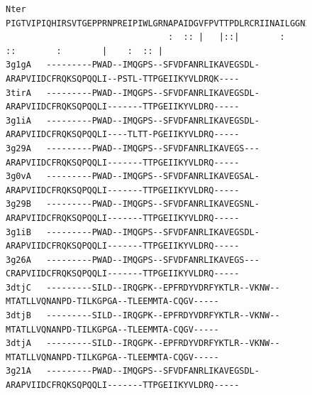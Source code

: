 \documentclass[12pt]{article}
\newcommand{\3}{$3_{10}$}
\begin{document}
\begin{figure}
\centering
\begin{singlespace}
\begin{tiny}
\begin{Verbatim}[frame=single]
Nter    PIGTVIPIQHIRSVTGEPPRNPREIPIWLGRNAPAIDGVFPVTTPDLRCRIINAILGGNIGLSLTPGDCLTWDSAVATLFIRTHGTFP
                                :  :: |   |::|        :    ::        :        |    :  :: |      
3g1gA   ---------PWAD--IMQGPS--SFVDFANRLIKAVEGSDL-ARAPVIIDCFRQKSQPQQLI--PSTL-TTPGEIIKYVLDRQK----
3tirA   ---------PWAD--IMQGPS--SFVDFANRLIKAVEGSDL-ARAPVIIDCFRQKSQPQQLI-------TTPGEIIKYVLDRQ-----
3g1iA   ---------PWAD--IMQGPS--SFVDFANRLIKAVEGSDL-ARAPVIIDCFRQKSQPQQLI----TLTT-PGEIIKYVLDRQ-----
3g29A   ---------PWAD--IMQGPS--SFVDFANRLIKAVEGS---ARAPVIIDCFRQKSQPQQLI-------TTPGEIIKYVLDRQ-----
3g0vA   ---------PWAD--IMQGPS--SFVDFANRLIKAVEGSAL-ARAPVIIDCFRQKSQPQQLI-------TTPGEIIKYVLDRQ-----
3g29B   ---------PWAD--IMQGPS--SFVDFANRLIKAVEGSNL-ARAPVIIDCFRQKSQPQQLI-------TTPGEIIKYVLDRQ-----
3g1iB   ---------PWAD--IMQGPS--SFVDFANRLIKAVEGSDL-ARAPVIIDCFRQKSQPQQLI-------TTPGEIIKYVLDRQ-----
3g26A   ---------PWAD--IMQGPS--SFVDFANRLIKAVEGS---CRAPVIIDCFRQKSQPQQLI-------TTPGEIIKYVLDRQ-----
3dtjC   ---------SILD--IRQGPK--EPFRDYVDRFYKTLR--VKNW--MTATLLVQNANPD-TILKGPGA--TLEEMMTA-CQGV-----
3dtjB   ---------SILD--IRQGPK--EPFRDYVDRFYKTLR--VKNW--MTATLLVQNANPD-TILKGPGA--TLEEMMTA-CQGV-----
3dtjA   ---------SILD--IRQGPK--EPFRDYVDRFYKTLR--VKNW--MTATLLVQNANPD-TILKGPGA--TLEEMMTA-CQGV-----
3g21A   ---------PWAD--IMQGPS--SFVDFANRLIKAVEGSDL-ARAPVIIDCFRQKSQPQQLI-------TTPGEIIKYVLDRQ-----


\end{Verbatim}
\end{tiny}
\end{singlespace}
\end{figure}
\end{document}
